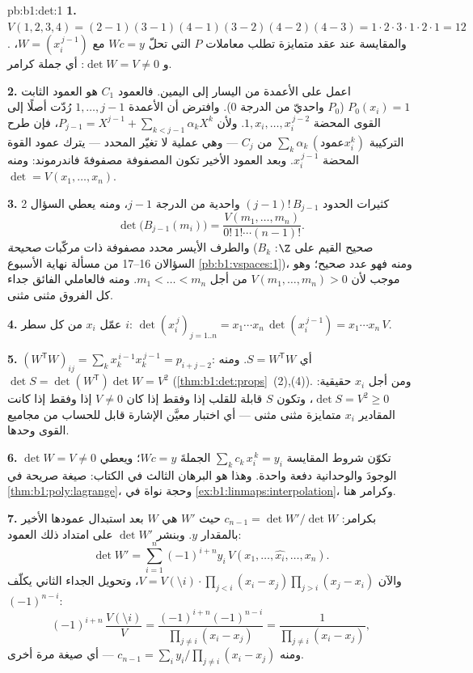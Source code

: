 \begin{solution}{pb:b1:det:1}
\textbf{1.} $V(1,2,3,4) = (2-1)(3-1)(4-1)(3-2)(4-2)(4-3) = 1
\cdot 2\cdot 3\cdot 1\cdot 2\cdot 1 = 12$. والمقايسة عند
عقد متمايزة تطلب معاملات $P$ التي تحلّ $W c =
y$ مع $W = (x_i^{\,j-1})$، و $\det W = V \neq 0$: أي جملة
كرامر.

\textbf{2.} اعمل على الأعمدة من اليسار إلى اليمين. فالعمود $C_1$
هو العمود الثابت $P_0(x_i) = 1$ ($P_0$ واحديّ من الدرجة
$0$). وافترض أن الأعمدة $1, \dots, j-1$ رُدّت أصلًا
إلى القوى المحضة $1, x_i, \dots, x_i^{\,j-2}$. ولأن $P_{j-1}
= X^{j-1} + \sum_{k < j-1}\alpha_k X^k$، فإن طرح
التركيبة $\sum_k \alpha_k\,(\text{عمود} x_i^k)$ من $C_j$
--- وهي عملية لا تغيّر المحدد --- يترك
عمود القوة المحضة $x_i^{\,j-1}$. وبعد العمود الأخير تكون
المصفوفة مصفوفةَ فاندرموند: ومنه $\det = V(x_1, \dots, x_n)$.

\textbf{3.} كثيرات الحدود $(j-1)!\,B_{j-1}$ واحدية من
الدرجة $j - 1$، ومنه يعطي السؤال 2
\[
\det\bigl(B_{j-1}(m_i)\bigr)
= \frac{V(m_1, \dots, m_n)}{0!\,1!\cdots(n-1)!} .
\]
والطرف الأيسر محدد مصفوفة ذات مركّبات \emph{صحيحة}
($B_k$ صحيح القيم على $\Z$: السؤالان 16--17 من
مسألة نهاية الأسبوع \cref{pb:b1:vspaces:1})، ومنه فهو عدد صحيح؛
وهو موجب لأن $V(m_1, \dots, m_n) > 0$ من أجل $m_1 <
\dots < m_n$. ومنه فالعاملي الفائق  جداء كل الفروق
مثنى مثنى.

\textbf{4.} عمّل $x_i$ من كل سطر $i$:
$\det(x_i^{\,j})_{j = 1..n} = x_1\cdots x_n\,
\det(x_i^{\,j-1}) = x_1\cdots x_n\,V$.

\textbf{5.} $(W^{\mathsf T}W)_{ij} = \sum_k x_k^{\,i-1}
x_k^{\,j-1} = p_{i+j-2}$: أي $S = W^{\mathsf T}W$. ومنه $\det S =
\det(W^{\mathsf T})\det W = V^2$
(\cref{thm:b1:det:props}~(2),(4)). ومن أجل $x_i$ حقيقية: $\det S = V^2
\geq 0$، وتكون $S$ قابلة للقلب إذا وفقط إذا كان $V \neq 0$ إذا وفقط إذا كانت المقادير $x_i$
متمايزة مثنى مثنى --- أي اختبار معيَّن الإشارة قابل للحساب من
مجاميع القوى وحدها.

\textbf{6.} تكوّن شروط المقايسة $\sum_{k}
c_k\,x_i^{\,k} = y_i$ الجملةَ $Wc = y$؛ ويعطي $\det W = V \neq
0$ الوجودَ والوحدانية دفعة واحدة. وهذا هو البرهان الثالث
في الكتاب: صيغة صريحة في
\cref{thm:b1:poly:lagrange}، وحجة نواة في
\cref{ex:b1:linmaps:interpolation}، وكرامر هنا.

\textbf{7.} بكرامر: $c_{n-1} = \det W'/\det W$ حيث $W'$ هي $W$
بعد استبدال عمودها الأخير بالمقدار $y$. وبنشر $\det W'$ على امتداد
ذلك العمود:
\[
\det W' = \sum_{i=1}^n (-1)^{i+n} y_i\,V(x_1, \dots, \widehat{x_i},
\dots, x_n) .
\]
والآن $V = V(\setminus i)\cdot\prod_{j<i}(x_i - x_j)\prod_{j>i}
(x_j - x_i)$، وتحويل الجداء الثاني يكلّف
$(-1)^{n-i}$:
\[
(-1)^{i+n}\,\frac{V(\setminus i)}{V}
= \frac{(-1)^{i+n}(-1)^{n-i}}{\prod_{j\neq i}(x_i - x_j)}
= \frac{1}{\prod_{j\neq i}(x_i - x_j)} ,
\]
ومنه $c_{n-1} = \sum_i y_i/\prod_{j \neq i}(x_i - x_j)$ ---
أي صيغة  مرة أخرى.


\end{solution}
